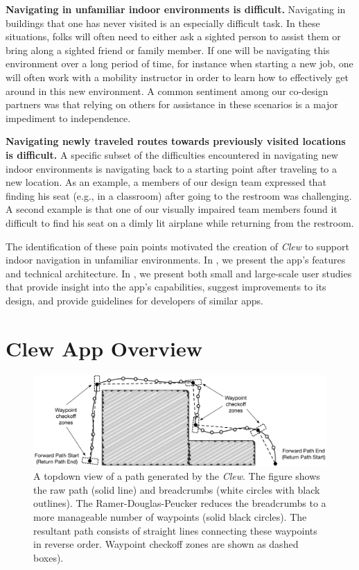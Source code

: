 \documentclass[chi_draft]{sigchi}
\begin{document}
\textbf{Navigating in unfamiliar indoor environments is difficult.} Navigating in buildings that one has never visited is an especially difficult task.  In these situations, folks will often need to either ask a sighted person to assist them or bring along a sighted friend or family member.  If one will be navigating this environment over a long period of time, for instance when starting a new job, one will often work with a mobility instructor in order to learn how to effectively get around in this new environment.  A common sentiment among our co-design partners was that relying on others for assistance in these scenarios is a major impediment to independence.

\textbf{Navigating newly traveled routes towards previously visited locations is difficult.} A specific subset of the difficulties encountered in navigating new indoor environments is navigating back to a starting point after traveling to a new location.  As an example, a members of our design team expressed that finding his seat (e.g., in a classroom) after going to the restroom was challenging.  A second example is that one of our visually impaired team members found it difficult to find his seat on a dimly lit airplane while returning from the restroom.

The identification of these pain points motivated the creation of \emph{Clew} to support indoor navigation in unfamiliar environments.  In \emph{}, we present the app's features and technical architecture.  In \emph{}, we present both small and large-scale user studies that provide insight into the app's capabilities, suggest improvements to its design, and provide guidelines for developers of similar apps.

\section{Clew App Overview}\label{sec:clewoverview}

\begin{figure}
\begin{center}
\includegraphics[width=\linewidth]{Figures/samplepath}
\end{center}
\caption{A topdown view of a path generated by the \emph{Clew}.  The figure shows the raw path (solid line) and breadcrumbs (white circles with black outlines).  The Ramer-Douglas-Peucker reduces the breadcrumbs to a more manageable number of waypoints (solid black circles).  The resultant path consists of straight lines connecting these waypoints in reverse order.  Waypoint checkoff zones are shown as dashed boxes).\label{fig:samplepath}}
\end{figure}
\end{document}

